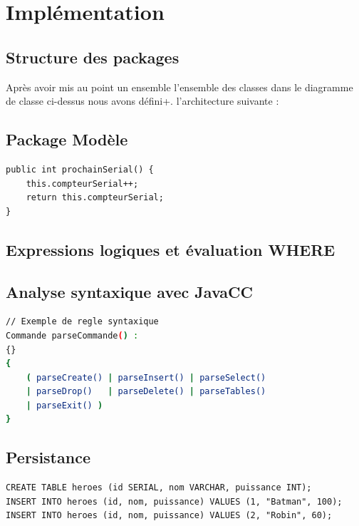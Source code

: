 
\section{Implémentation}

\subsection{Structure des packages}
Après avoir mis au point un ensemble l'ensemble des classes dans le diagramme de classe ci-dessus nous avons défini+.  l'architecture suivante : 


\subsection{Package Modèle}

\begin{lstlisting}[caption=Compteur SERIAL global dans BaseDeDonnees]
public int prochainSerial() {
    this.compteurSerial++;
    return this.compteurSerial;
}
\end{lstlisting}

\subsection{Expressions logiques et évaluation WHERE}

\subsection{Analyse syntaxique avec JavaCC}

\begin{lstlisting}[language=bash, caption=Extrait de la grammaire SGBD.jj]
// Exemple de regle syntaxique
Commande parseCommande() :
{}
{
    ( parseCreate() | parseInsert() | parseSelect()
    | parseDrop()   | parseDelete() | parseTables()
    | parseExit() )
}
\end{lstlisting}

\subsection{Persistance}

\begin{lstlisting}[caption=Exemple de fichier de sauvegarde mabase.sql]
CREATE TABLE heroes (id SERIAL, nom VARCHAR, puissance INT);
INSERT INTO heroes (id, nom, puissance) VALUES (1, "Batman", 100);
INSERT INTO heroes (id, nom, puissance) VALUES (2, "Robin", 60);
\end{lstlisting}